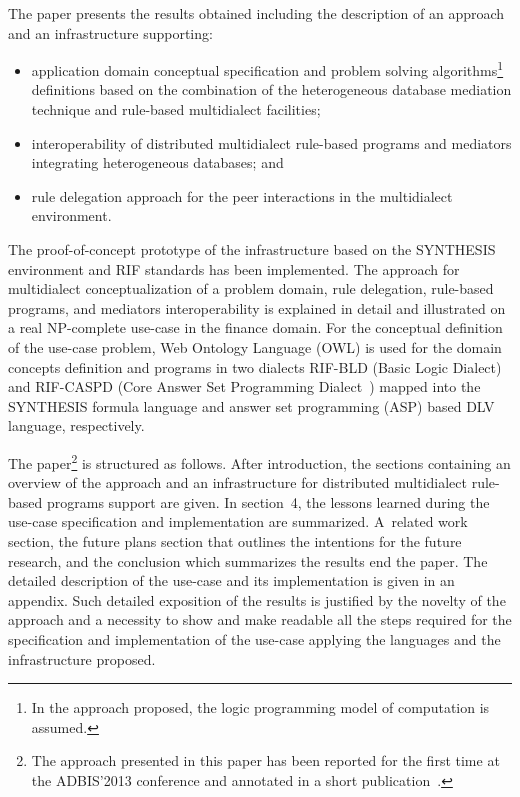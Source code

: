 \begin{multicols}{2}
  The paper presents the results obtained including the description of an approach
and an infrastructure supporting:
  \begin{itemize}
 \item application domain conceptual specification and problem solving
algorithms\footnote{In the approach proposed, the logic programming model of
computation is assumed.} definitions based on the combination of the
heterogeneous database mediation technique and rule-based multidialect facilities;
\item interoperability of distributed multidialect rule-based programs and mediators
integrating heterogeneous databases; and
\item rule delegation approach for the peer interactions in the multidialect
environment.
\end{itemize}

  The proof-of-concept prototype of the infrastructure based on the SYNTHESIS
environment and RIF standards has been implemented. The approach for multidialect
conceptualization of a problem domain, rule delegation, rule-based programs, and
mediators interoperability is explained in detail and illustrated on a real NP-complete
use-case in the finance domain. For the conceptual definition of the use-case problem,
Web Ontology Language (OWL) is used for the domain concepts definition and programs in two dialects
  RIF-BLD (Basic Logic Dialect) and RIF-CASPD
  (Core Answer Set Programming Dialect~\cite{10-kal}) mapped into the SYNTHESIS formula language and
answer set programming (ASP) based DLV~\cite{9-kal} language, respectively.

  The paper\footnote{The approach presented in this paper has been reported for the
first time at the ADBIS'2013 conference and annotated in a short
publication~\cite{10-kal}.} is structured as follows. After introduction, the
sections containing an overview of the approach and an infrastructure for distributed
multidialect rule-based programs support are given. In section~4, the lessons
learned during the use-case specification and implementation are summarized.
A~related work section, the future plans section that outlines the intentions for the
future research, and the conclusion which summarizes the results end the paper. The
detailed description of the use-case and its implementation is given in an appendix.
Such detailed exposition of the results is justified by the novelty of the approach and a
necessity to show and make readable all the steps required for the specification and
implementation of the use-case applying the languages and the infrastructure
proposed.


\end{multicols}
